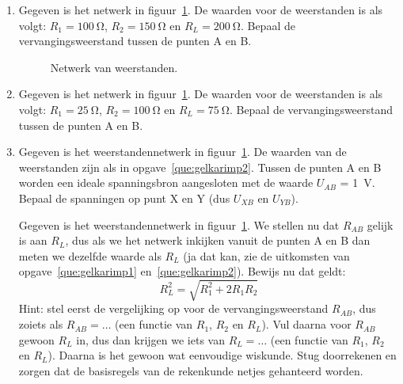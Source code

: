 \begin{enumerate}[labelindent=0pt,labelwidth=\widthof{8.88.\ },label=\textbf{\thechapter.\arabic*.},leftmargin=!,ref=\thechapter.\arabic*]


\item
\label{que:gelkarimp1}
Gegeven is het netwerk in figuur~\ref{fig:gelkarimp1}. De waarden voor de weerstanden is als volgt: $R_1 = \SI{100}{\ohm}$, $R_2 = \SI{150}{\ohm}$ en $R_L = \SI{200}{\ohm}$. Bepaal de vervangingsweerstand tussen de punten A en B.

\begin{figure}[!ht]
\centering
{}
\caption{Netwerk van weerstanden.}
\label{fig:gelkarimp1}
\end{figure}

\item
\label{que:gelkarimp2}
Gegeven is het netwerk in figuur~\ref{fig:gelkarimp1}. De waarden voor de weerstanden is als volgt: $R_1 = \SI{25}{\ohm}$, $R_2 = \SI{100}{\ohm}$ en $R_L = \SI{75}{\ohm}$. Bepaal de vervangingsweerstand tussen de punten A en B.


\item
\label{que:gelkarimp3}
Gegeven is het weerstandennetwerk in figuur~\ref{fig:gelkarimp1}. De waarden van de weerstanden zijn als in opgave~\ref{que:gelkarimp2}. Tussen de punten A en B worden een ideale spanningsbron aangesloten met de waarde $U_{AB}$ = \SI{1}{\volt}. Bepaal de spanningen op punt X en Y (dus $U_{XB}$ en $U_{YB}$).

\itemstar 
\label{que:gelkarimp4}
Gegeven is het weerstandennetwerk in figuur~\ref{fig:gelkarimp1}. We stellen nu dat $R_{AB}$ gelijk is aan $R_L$, dus als we het netwerk inkijken vanuit de punten A en B dan meten we dezelfde waarde als $R_L$ (ja dat kan, zie de uitkomsten van opgave~\ref{que:gelkarimp1} en~\ref{que:gelkarimp2}). Bewijs nu dat geldt:
%
\begin{equation}
R_L^2 = \sqrt{R_1^2 + 2R_1R_2}
\end{equation}
%
Hint: stel eerst de vergelijking op voor de vervangingsweerstand $R_{AB}$, dus zoiets als $R_{AB} = \ldots$ (een functie van $R_1$, $R_2$ en $R_L$). Vul daarna voor $R_{AB}$ gewoon $R_L$ in, dus dan krijgen we iets van $R_L = \ldots$ (een functie van $R_1$, $R_2$ en $R_L$). Daarna is het gewoon wat eenvoudige wiskunde. Stug doorrekenen en zorgen dat de basisregels van de rekenkunde netjes gehanteerd worden.


\end{enumerate}
